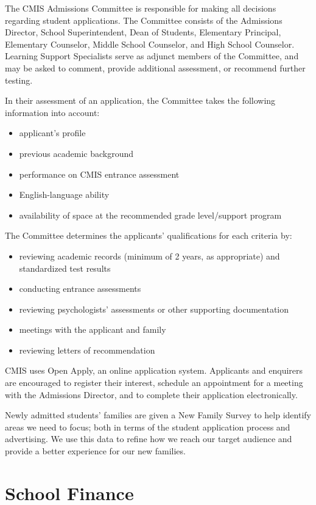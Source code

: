 The CMIS Admissions Committee is responsible for making all decisions regarding student applications. The Committee consists of the Admissions Director, School Superintendent, Dean of Students, Elementary Principal, Elementary Counselor, Middle School Counselor, and High School Counselor.    Learning Support Specialists serve as adjunct members of the Committee, and may be asked to comment, provide additional assessment, or recommend further testing.  

In their assessment of an application, the Committee takes the following information into account:

\begin{itemize}
\item applicant's profile
\item previous academic background
\item performance on CMIS entrance assessment
\item English-language ability
\item availability of space at the recommended grade level/support program
\end{itemize}

The Committee determines the applicants’ qualifications for each criteria by:

\begin{itemize}
\item reviewing academic records (minimum of 2 years, as appropriate) and standardized test results
\item conducting entrance assessments
\item reviewing psychologists' assessments or other supporting documentation
\item meetings with the applicant and family
\item reviewing letters of recommendation
\end{itemize}

CMIS uses Open Apply, an online application system.  Applicants and enquirers are encouraged to register their interest, schedule an appointment for a meeting with the Admissions Director, and to complete their application electronically.  

Newly admitted students’ families are given a New Family Survey to help identify areas we need to focus; both in terms of the student application process and advertising. We use this data to refine how we reach our target audience and provide a better experience for our new families.

\section{School Finance}

